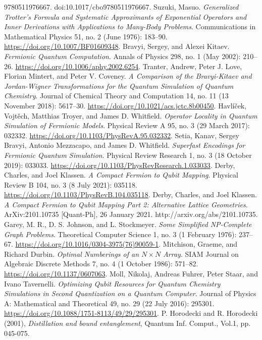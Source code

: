 \documentclass[twoside]{article}
\begin{document}
\begin{thebibliography}{000}
{9780511976667. doi:10.1017/cbo9780511976667. 
 Suzuki, Masuo. {\it Generalized Trotter’s Formula and Systematic Approximants of Exponential Operators and Inner Derivations with Applications to Many-Body Problems}. Communications in Mathematical Physics 51, no. 2 (June 1976): 183–90. \url{https://doi.org/10.1007/BF01609348}.
 Bravyi, Sergey, and Alexei Kitaev. {\it Fermionic Quantum Computation}. Annals of Physics 298, no. 1 (May 2002): 210–26. \url{https://doi.org/10.1006/aphy.2002.6254}.
 Tranter, Andrew, Peter J. Love, Florian Mintert, and Peter V. Coveney. {\it A Comparison of the Bravyi-Kitaev and Jordan-Wigner Transformations for the Quantum Simulation of Quantum Chemistry}. Journal of Chemical Theory and Computation 14, no. 11 (13 November 2018): 5617–30. \url{https://doi.org/10.1021/acs.jctc.8b00450}.
 Havlíček, Vojtěch, Matthias Troyer, and James D. Whitfield. {\it Operator Locality in Quantum Simulation of Fermionic Models}. Physical Review A 95, no. 3 (29 March 2017): 032332. \url{https://doi.org/10.1103/PhysRevA.95.032332}.
 Setia, Kanav, Sergey Bravyi, Antonio Mezzacapo, and James D. Whitfield. {\it Superfast Encodings for Fermionic Quantum Simulation}. Physical Review Research 1, no. 3 (18 October 2019): 033033. \url{https://doi.org/10.1103/PhysRevResearch.1.033033}.
 Derby, Charles, and Joel Klassen. {\it A Compact Fermion to Qubit Mapping}. Physical Review B 104, no. 3 (8 July 2021): 035118. \url{https://doi.org/10.1103/PhysRevB.104.035118}.
 Derby, Charles, and Joel Klassen. {\it A Compact Fermion to Qubit Mapping Part 2: Alternative Lattice Geometries}. ArXiv:2101.10735 [Quant-Ph], 26 January 2021. http://arxiv.org/abs/2101.10735.
 Garey, M. R., D. S. Johnson, and L. Stockmeyer. {\it Some Simplified NP-Complete Graph Problems}. Theoretical Computer Science 1, no. 3 (1 February 1976): 237–67. \url{https://doi.org/10.1016/0304-3975(76)90059-1}.
 Mitchison, Graeme, and Richard Durbin. {\it Optimal Numberings of an $N \times N$ Array}. SIAM Journal on Algebraic Discrete Methods 7, no. 4 (1 October 1986): 571–82. \url{https://doi.org/10.1137/0607063}.
 Moll, Nikolaj, Andreas Fuhrer, Peter Staar, and Ivano Tavernelli. {\it Optimizing Qubit Resources for Quantum Chemistry Simulations in Second Quantization on a Quantum Computer}. Journal of Physics A: Mathematical and Theoretical 49, no. 29 (22 July 2016): 295301. \url{https://doi.org/10.1088/1751-8113/49/29/295301}.
P. Horodecki and R. Horodecki (2001), {\it Distillation and bound entanglement},
Quantum Inf. Comput., Vol.1, pp. 045-075.

}
\end{thebibliography}
\end{document}
